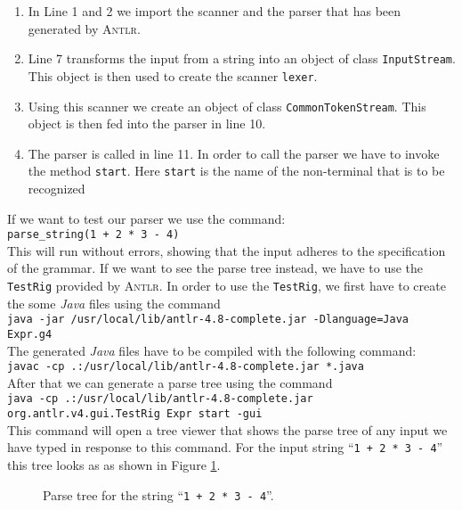 \begin{enumerate}
\item In Line 1 and 2 we import the scanner and the parser that has been generated by \textsc{Antlr}.
\item Line 7 transforms the input from a string into an object of class \texttt{InputStream}.
      This object is then used to create the scanner \texttt{lexer}.
\item Using this scanner we create an object of class \texttt{CommonTokenStream}.
      This object is then fed into the parser in line 10.
\item The parser is called in line 11.  In order to call the parser we have to invoke the method 
      \texttt{start}.  Here \texttt{start} is the name of the non-terminal that is to be recognized
\end{enumerate}
If we want to test our parser we use the command:
\\[0.2cm]
\hspace*{1.3cm}
\texttt{parse\_string(1 + 2 * 3 - 4)}
\\[0.2cm]
This will run without errors, showing that the input adheres to the specification of the grammar.
If we want to see the parse tree instead, we have to use the \texttt{TestRig} provided by \textsc{Antlr}.
In order to use the \texttt{TestRig}, we first have to create the some \textsl{Java} files using the command
\\[0.2cm]
\hspace*{1.3cm}
\texttt{java -jar /usr/local/lib/antlr-4.8-complete.jar -Dlanguage=Java Expr.g4}
\\[0.2cm]
The generated \textsl{Java} files have to be compiled with the following command:
\\[0.2cm]
\hspace*{1.3cm}
\texttt{javac -cp .:/usr/local/lib/antlr-4.8-complete.jar *.java}
\\[0.2cm]
After that we can generate a parse tree using the command
\\[0.2cm]
\hspace*{0.3cm}
\texttt{java -cp .:/usr/local/lib/antlr-4.8-complete.jar org.antlr.v4.gui.TestRig Expr start -gui}
\\[0.2cm]
This command will open a tree viewer that shows the parse tree of any input we have typed in response to this command.
For the input string ``\texttt{1 + 2 * 3 - 4}''  this tree looks as as shown in Figure \ref{fig:expr.eps}.

\begin{figure}[!ht]
  \centering
   \caption{Parse tree for the string ``\texttt{1 + 2 * 3 - 4}''.}
  \label{fig:expr.eps}
\end{figure}



